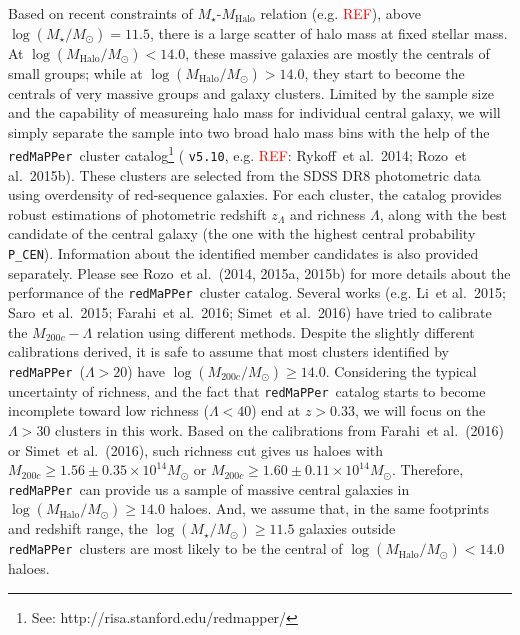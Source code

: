 \documentclass[preprint]{aastex}
\def\etal{{\ et al.~}}
\def\redm{\texttt{redMaPPer}~}
\def\logms{$\log (M_{\star}/M_{\odot})$}
\def\logmh{$\log (M_{\mathrm{Halo}}/M_{\odot})$}
\newcommand{\addref}{{\textcolor{red}{REF}}}
\begin{document}
\begin{CJK*}{UTF8}{gbsn}
    Based on recent constraints of $M_{\star}$-$M_{\mathrm{Halo}}$ relation (e.g.
    \addref), above \logms$ = 11.5$, there is a large scatter of halo mass at fixed
    stellar mass.  
    At \logmh$<14.0$, these massive galaxies are mostly the centrals of small groups;
    while at \logmh$>14.0$, they start to become the centrals of very massive groups and
    galaxy clusters.   
    Limited by the sample size and the capability of measureing halo mass for individual
    central galaxy, we will simply separate the sample into two broad halo mass bins with
    the help of the \redm cluster catalog\footnote{See:
    http://risa.stanford.edu/redmapper/} ( \texttt{v5.10}, e.g. \addref: Rykoff\etal 2014;
    Rozo\etal 2015b).
    These clusters are selected from the SDSS DR8 photometric data using overdensity of
    red-sequence galaxies. 
    For each cluster, the catalog provides robust estimations of photometric redshift
    $z_{\Lambda}$ and richness $\Lambda$, along with the best candidate of the central
    galaxy (the one with the highest central probability \texttt{P\_CEN}).
    Information about the identified member candidates is also provided separately. 
    Please see Rozo\etal (2014, 2015a, 2015b) for more details about the performance of
    the \redm cluster catalog.      
    Several works (e.g. Li\etal 2015; Saro\etal 2015; Farahi\etal 2016; Simet\etal 2016)
    have tried to calibrate the $M_{200c}-\Lambda$ relation using different methods.
    Despite the slightly different calibrations derived, it is safe to assume that most
    clusters identified by \redm ($\Lambda > 20$) have $\log (M_{200c}/M_{\odot}) \geq
    14.0$.  
    Considering the typical uncertainty of richness, and the fact that \redm catalog
    starts to become incomplete toward low richness ($\Lambda < 40$) end at $z > 0.33$, we
    will focus on the $\Lambda > 30$ clusters in this work.  
    Based on the calibrations from Farahi\etal (2016) or Simet\etal (2016), 
    such richness cut gives us haloes with 
    $M_{200c} \geq 1.56\pm0.35 \times 10^{14} M_{\odot}$ or 
    $M_{200c} \geq 1.60\pm0.11 \times 10^{14} M_{\odot}$.  
    Therefore, \redm can provide us a sample of massive central galaxies in \logmh$\geq
    14.0$ haloes.  
    And, we assume that, in the same footprints and redshift range, the \logms$\geq 11.5$
    galaxies outside \redm clusters are most likely to be the central of \logmh$< 14.0$
    haloes. 
    

\end{CJK*}
\end{document}
